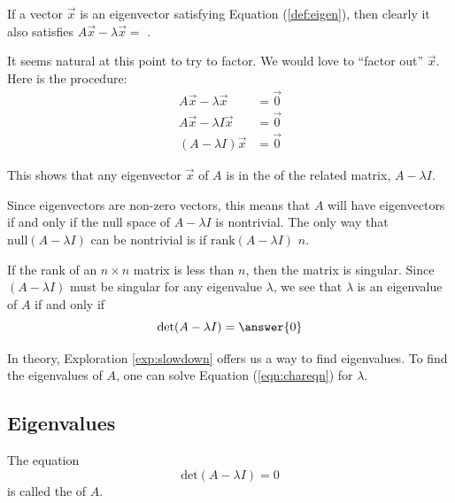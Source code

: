 \documentclass{ximera}
\begin{document}
\begin{exploration}\label{exp:slowdown}
If a vector $\vec{x}$ is an eigenvector satisfying Equation (\ref{def:eigen}), then clearly it also satisfies  $A\vec{x}-\lambda \vec{x} =$ .

It seems natural at this point to try to factor.  We would love to ``factor out'' $\vec{x}$.  Here is the procedure:
\begin{align*}
A\vec{x}-\lambda \vec{x} &= \vec{0} \\
A\vec{x}-\lambda I\vec{x} &= \vec{0} \\
(A-\lambda I)\vec{x} &= \vec{0}
\end{align*}

This shows that any eigenvector $\vec{x}$ of $A$ is in the   of the related matrix, $A-\lambda I$.

Since eigenvectors are non-zero vectors, this means that $A$ will have eigenvectors if and only if the null space of $A-\lambda I$ is nontrivial.  The only way that $\mbox{null}(A-\lambda I)$ can be nontrivial is if $\mbox{rank}(A-\lambda I)$ \wordChoice{\choice{$=$}\choice[correct]{$<$}\choice{$>$}} $n$.

If the rank of an $n \times n$ matrix is less than $n$, then the matrix is singular.  Since $(A-\lambda I)$ must be singular for any eigenvalue $\lambda$, we see that $\lambda$ is an eigenvalue of $A$ if and only if 
\begin{equation}\label{eqn:chareqn}
\mbox{det}(A-\lambda I) = \answer{0}
\end{equation}
\end{exploration}
In theory, Exploration \ref{exp:slowdown} offers us a way to find eigenvalues.  To find the eigenvalues of $A$, one can solve Equation (\ref{eqn:chareqn}) for $\lambda$. 

\subsection*{Eigenvalues}
 
\begin{definition}\label{def:chareqcharpoly}
The equation 
$$\mbox{det}(A-\lambda I) = 0$$ is called the  of $A$. 
\end{definition}
\end{document}
